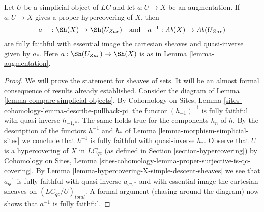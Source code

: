 \begin{lemma}
\label{lemma-descent-sheaves-for-proper-hypercovering}
Let $U$ be a simplicial object of $\textit{LC}$ and let $a : U \to X$
be an augmentation. If $a : U \to X$ gives a proper hypercovering of $X$,
then
$$
a^{-1} : \Sh(X) \to \Sh(U_{Zar})
\quad\text{and}\quad
a^{-1} : \textit{Ab}(X) \to \textit{Ab}(U_{Zar})
$$
are fully faithful with essential image the cartesian sheaves and
quasi-inverse given by $a_*$. Here $a : \Sh(U_{Zar}) \to \Sh(X)$ is as in
Lemma \ref{lemma-augmentation}.
\end{lemma}

\begin{proof}
We will prove the statement for sheaves of sets. It will be an
almost formal consequence of results already established.
Consider the diagram of Lemma \ref{lemma-compare-simplicial-objects}.
By Cohomology on Sites, Lemma \ref{sites-cohomology-lemma-describe-pullback-pi}
the functor $(h_{-1})^{-1}$ is fully faithful with quasi-inverse $h_{-1, *}$.
The same holds true for the components $h_n$ of $h$.
By the description of the functors $h^{-1}$ and $h_*$ of
Lemma \ref{lemma-morphism-simplicial-sites}
we conclude that $h^{-1}$ is fully faithful with quasi-inverse $h_*$.
Observe that $U$ is a hypercovering of $X$ in $\textit{LC}_{qc}$
(as defined in Section \ref{section-hypercovering}) by
Cohomology on Sites, Lemma
\ref{sites-cohomology-lemma-proper-surjective-is-qc-covering}.
By Lemma \ref{lemma-hypercovering-X-simple-descent-sheaves}
we see that $a_{qc}^{-1}$ is fully faithful with quasi-inverse $a_{qc, *}$
and with essential image the cartesian sheaves on
$(\textit{LC}_{qc}/U)_{total}$.
A formal argument (chasing around the diagram) now shows that
$a^{-1}$ is fully faithful.


\end{proof}
